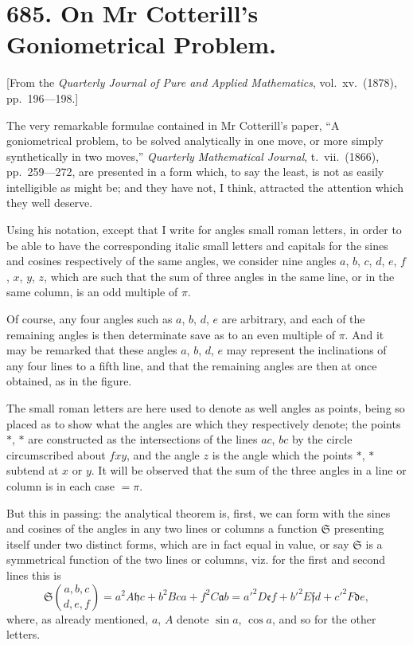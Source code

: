 \documentclass[11pt,a4paper]{book}
\begin{document}
\newpage

\section*{685. On Mr Cotterill's Goniometrical Problem.}

[From the \textit{Quarterly Journal of Pure and Applied Mathematics}, vol.\ xv.\ (1878), pp.\ 196---198.]

The very remarkable formulae contained in Mr Cotterill's paper, ``A goniometrical problem, to be solved analytically in one move, or more simply synthetically in two moves,'' \textit{Quarterly Mathematical Journal}, t.\ vii.\ (1866), pp.\ 259---272, are presented in a form which, to say the least, is not as easily intelligible as might be; and they have not, I think, attracted the attention which they well deserve.

Using his notation, except that I write for angles small roman letters, in order to be able to have the corresponding italic small letters and capitals for the sines and cosines respectively of the same angles, we consider nine angles $a$, $b$, $c$, $d$, $e$, $f$, $x$, $y$, $z$, which are such that the sum of three angles in the same line, or in the same column, is an odd multiple of $\pi$.

Of course, any four angles such as $a$, $b$, $d$, $e$ are arbitrary, and each of the remaining angles is then determinate save as to an even multiple of $\pi$. And it may be remarked that these angles $a$, $b$, $d$, $e$ may represent the inclinations of any four lines to a fifth line, and that the remaining angles are then at once obtained, as in the figure.

The small roman letters are here used to denote as well angles as points, being so placed as to show what the angles are which they respectively denote; the points $*$, $*$ are constructed as the intersections of the lines $ac$, $bc$ by the circle circumscribed about $fxy$, and the angle $z$ is the angle which the points $*$, $*$ subtend at $x$ or $y$. It will be observed that the sum of the three angles in a line or column is in each case $= \pi$.

But this in passing: the analytical theorem is, first, we can form with the sines and cosines of the angles in any two lines or columns a function $\mathfrak{S}$ presenting itself under two distinct forms, which are in fact equal in value, or say $\mathfrak{S}$ is a symmetrical function of the two lines or columns, viz. for the first and second lines this is
\[
\mathfrak{S}\binom{a,b,c}{d,e,f} = a^2 A\mathfrak{h}c + b^2 Bca + f^2 C\mathfrak{a}b = a'^2 D\mathfrak{e}f + b'^2 E\mathfrak{f}d + c'^2 F\mathfrak{d}e,
\]
where, as already mentioned, $a$, $A$ denote $\sin a$, $\cos a$, and so for the other letters.
\end{document}

